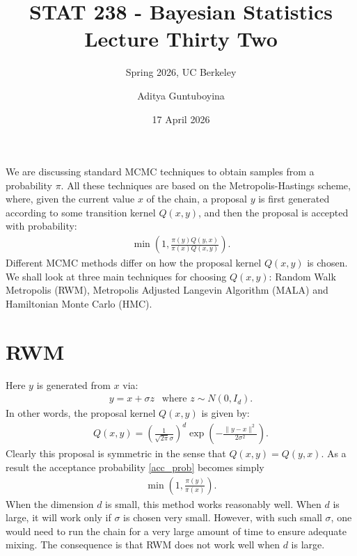 \documentclass{scrartcl}
\begin{document}
\title{STAT 238 - Bayesian Statistics  \\
  Lecture Thirty Two} 
\subtitle{Spring 2026, UC Berkeley}

\author{Aditya Guntuboyina}


\date{17 April 2026}

\maketitle

We are discussing standard MCMC techniques to obtain samples from a
probability $\pi$. All these techniques are based on the
Metropolis-Hastings scheme, where, given the current value $x$ of the
chain, a proposal $y$ is first generated according to some transition
kernel $Q(x, y)$, and then the proposal is accepted with probability:
\begin{align}\label{acc_prob}
  \min \left(1, \frac{\pi(y) Q(y, x)}{\pi(x) Q(x, y)} \right). 
\end{align}
Different MCMC methods differ on how the proposal kernel $Q(x, y)$ is
chosen. We shall look at three main techniques for choosing $Q(x, y)$:
Random Walk Metropolis (RWM), Metropolis Adjusted Langevin Algorithm
(MALA) and Hamiltonian Monte Carlo (HMC). 

\section{RWM}

Here $y$ is generated from $x$ via:
\begin{align*}
  y = x + \sigma z ~~ \text{ where $z \sim N(0, I_d)$}. 
\end{align*}
In other words, the proposal kernel $Q(x, y)$ is given by:
\begin{align*}
  Q(x, y) = \left(\frac{1}{\sqrt{2 \pi} \sigma} \right)^{d} \exp
  \left(-\frac{\|y - x\|^2}{2 \sigma^2} \right). 
\end{align*}
Clearly this proposal is symmetric in the sense that $Q(x, y) = Q(y,
x)$. As a result the acceptance probability \eqref{acc_prob} becomes
simply
\begin{align*}
  \min \left(1, \frac{\pi(y)}{\pi(x)} \right). 
\end{align*}
When the dimension $d$ is small, this method works reasonably
well. When $d$ is large, it will work only if $\sigma$ is
chosen very small. However, with such small $\sigma$, one would need
to run the chain for a very large amount of time to ensure adequate
mixing. The consequence is that RWM does not work well when $d$ is
large.
\end{document}
